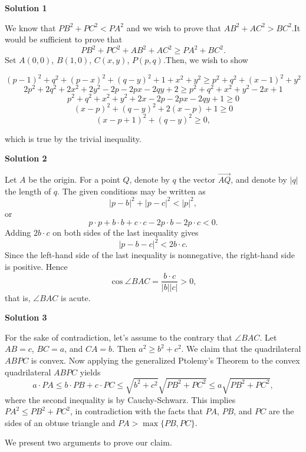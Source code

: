 \begin{enumerate}
 



\textbf{Solution 1}

We know that $PB^2+PC^2 < PA^2$ and we wish to prove that $AB^2 + AC^2 > BC^2$.It would be sufficient to prove that
 \[PB^2+PC^2+AB^2+AC^2 \geq PA^2 + BC^2.\]Set $A(0,0)$, $B(1,0)$, $C(x,y)$, $P(p,q)$.Then, we wish to show

 
 \[(p-1)^2 + q^2 + (p-x)^2 + (q-y)^2 + 1 + x^2 + y^2 \geq p^2 + q^2 + (x-1)^2 + y^2\]
 \[2p^2 + 2q^2 + 2x^2 + 2y^2 - 2p - 2px - 2qy + 2 \geq p^2 + q^2 + x^2 + y^2 - 2x + 1\]
 \[p^2 + q^2 + x^2 + y^2 + 2x - 2p - 2px - 2qy + 1 \geq 0\]
 \[(x-p)^2 + (q-y)^2 + 2(x-p) + 1 \geq 0\] 
 \[(x-p+1)^2 + (q-y)^2 \geq 0,\]

 which is true by the trivial inequality.

 



\textbf{Solution 2}

Let $A$ be the origin. For a point $Q$, denote by $q$ the vector $\overrightarrow{AQ}$, and denote by $|q|$ the length of $q$. The given conditions may be written as
 \[|p - b|^2 + |p - c|^2 < |p|^2,\]or
 \[p\cdot p + b\cdot b + c\cdot c - 2p\cdot b - 2p\cdot c < 0.\]Adding $2b\cdot c$ on both sides of the last inequality gives
 \[|p - b - c|^2 < 2b\cdot c.\]Since the left-hand side of the last inequality is nonnegative, the right-hand side is positive. Hence
 \[\cos\angle BAC = \frac{b\cdot c}{|b||c|} > 0,\]that is, $\angle BAC$ is acute.

 



\textbf{Solution 3}

For the sake of contradiction, let's assume to the contrary that $\angle BAC$. Let $AB = c$, $BC = a$, and $CA = b$. Then $a^2\geq b^2 + c^2$. We claim that the quadrilateral $ABPC$ is convex. Now applying the generalized Ptolemy's Theorem to the convex quadrilateral $ABPC$ yields
 \[a\cdot PA\leq b\cdot PB + c\cdot PC\leq\sqrt{b^2 + c^2}\sqrt{PB^2 + PC^2}\leq a\sqrt{PB^2 + PC^2},\]where the second inequality is by Cauchy-Schwarz. This implies $PA^2\leq PB^2 + PC^2$, in contradiction with the facts that $PA$, $PB$, and $PC$ are the sides of an obtuse triangle and $PA > \max\{PB, PC\}$.

 We present two arguments to prove our claim.


\end{enumerate}

